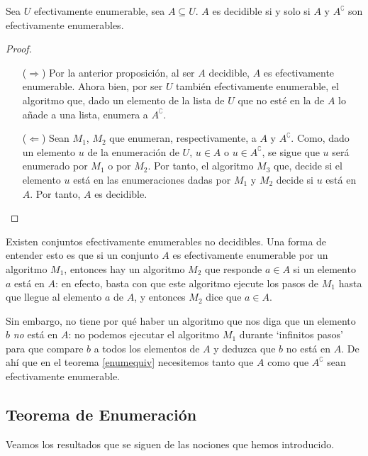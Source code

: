 \begin{theorem*}\label{enumequiv}
Sea $U$ efectivamente enumerable, sea $A\subseteq U$. $A$ es decidible si y solo si $A$ y $A^{\complement}$ son efectivamente enumerables.
\end{theorem*}
\begin{proof}\mbox{}
\begin{itemize}
    \item[($\Longrightarrow$)] Por la anterior proposición, al ser $A$ decidible, $A$ es efectivamente enumerable. Ahora bien, por ser $U$ también efectivamente enumerable, el algoritmo que, dado un elemento de la lista de $U$ que no esté en la de $A$ lo añade a una lista, enumera a $A^{\complement}$.
    \item[($\Longleftarrow$)] Sean $M_1$, $M_2$ que enumeran, respectivamente, a $A$ y $A^{\complement}$. Como, dado un elemento $u$ de la enumeración de $U$, $u \in A$ o $u \in A^{\complement}$, se sigue que $u$ será enumerado por $M_1$ o por $M_2$. Por tanto, el algoritmo $M_3$ que, decide si el elemento $u$ está en las enumeraciones dadas por $M_1$ y $M_2$ decide si $u$ está en $A$. Por tanto, $A$ es decidible.
\end{itemize}
\end{proof}

\begin{note}
Existen conjuntos efectivamente enumerables no decidibles. Una forma de entender esto es que si un conjunto $A$ es efectivamente enumerable por un algoritmo $M_1$, entonces hay un algoritmo $M_2$ que responde $a\in A$ si un elemento $a$ está en $A$: en efecto, basta con que este algoritmo ejecute los pasos de $M_1$ hasta que llegue al elemento $a$ de $A$, y entonces $M_2$ dice que  $a\in A$.

Sin  embargo, no tiene por qué haber un algoritmo que nos diga que un  elemento $b$ \textit{no} está en $A$: no podemos ejecutar el algoritmo $M_1$ durante `infinitos pasos' para  que compare $b$ a  todos los elementos de $A$ y deduzca que $b$ no está  en $A$. De ahí que en el teorema \ref{enumequiv} necesitemos  tanto  que $A$  como que $A^{\complement}$ sean efectivamente enumerable.
\end{note}

\subsection{Teorema de Enumeración}

Veamos los resultados que se siguen de las nociones que hemos introducido. 

